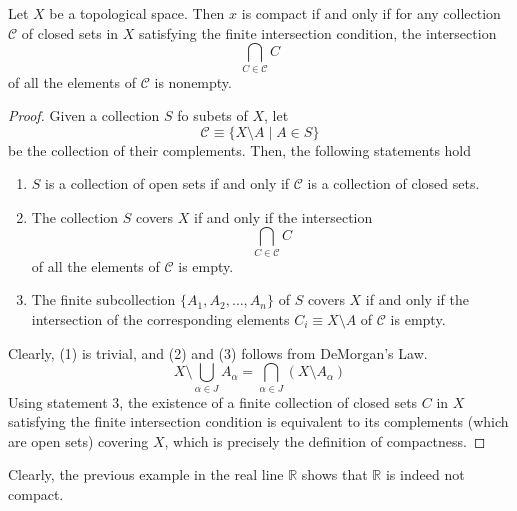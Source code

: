     \begin{theorem}
      Let $X$ be a topological space. Then $x$ is compact if and only if for any collection $\mathcal{C}$ of closed sets in $X$ satisfying the finite intersection condition, the intersection 
      \begin{equation}
        \bigcap_{C \in \mathcal{C}} C
      \end{equation}
      of all the elements of $\mathcal{C}$ is nonempty. 
    \end{theorem}
    \begin{proof}
      Given a collection $S$ fo subets of $X$, let 
      \begin{equation}
        \mathcal{C} \equiv \{X \setminus A \; | \; A \in S\}
      \end{equation}
      be the collection of their complements. Then, the following statements hold 
      \begin{enumerate}
        \item $S$ is a collection of open sets if and only if $\mathcal{C}$ is a collection of closed sets. 
        \item The collection $S$ covers $X$ if and only if the intersection 
        \begin{equation}
          \bigcap_{C \in \mathcal{C}} C
        \end{equation}
        of all the elements of $\mathcal{C}$ is empty. 

        \item The finite subcollection $\{A_1, A_2, \ldots , A_n\}$ of $S$ covers $X$ if and only if the intersection of the corresponding elements $C_i \equiv X \setminus A$ of $\mathcal{C}$ is empty. 
      \end{enumerate}
      Clearly, (1) is trivial, and (2) and (3) follows from DeMorgan's Law. 
      \begin{equation}
        X \setminus \bigcup_{\alpha \in J} A_\alpha = \bigcap_{\alpha \in J} (X \setminus A_\alpha)
      \end{equation}
      Using statement 3, the existence of a finite collection of closed sets $C$ in $X$ satisfying the finite intersection condition is equivalent to its complements (which are open sets) covering $X$, which is precisely the definition of compactness. 
    \end{proof}

    Clearly, the previous example in the real line $\mathbb{R}$ shows that $\mathbb{R}$ is indeed not compact. 

